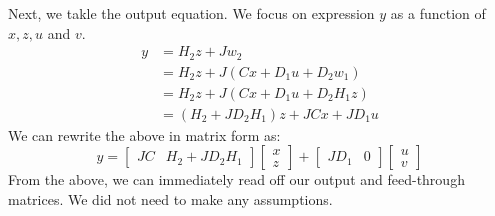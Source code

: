 \documentclass[12pt]{exam}
\begin{document}
\begin{questions}
\begin{solution}
    Next, we takle the output equation. We focus on expression $y$ as a function of $x,z, u$ and $v$.
    \begin{align*}
      y &= H_2z + Jw_2 \tag{Given output equation} \\
      &= H_2z + J(Cx + D_1u + D_2w_1) \tag{Equation for $w_2$} \\
      &= H_2z + J(Cx + D_1u + D_2H_1z) \tag{Equation for $w_1$} \\
      &= (H_2 + JD_2H_1)z + JCx + JD_1u \tag{Grouping like terms}
    \end{align*}
    We can rewrite the above in matrix form as:
    \[
      y =
        \begin{bmatrix}
          JC & H_2 + JD_2H_1
        \end{bmatrix}
        \begin{bmatrix}
          x \\ z
        \end{bmatrix}
        + 
        \begin{bmatrix}
          JD_1 & 0
        \end{bmatrix}
        \begin{bmatrix}
          u \\ v
        \end{bmatrix}
    \]
    From the above, we can immediately read off our output and feed-through matrices. We did not need to make any assumptions.


\end{solution}
\end{questions}
\end{document}
